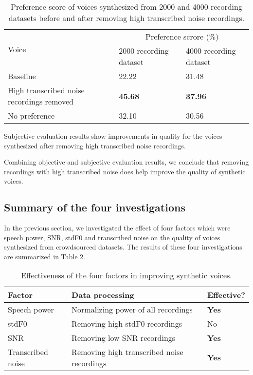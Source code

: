\documentclass[12pt]{article}
\begin{document}
\begin{table}[]
\begin{center}
\caption{Preference score of voices synthesized from 2000 and 4000-recording datasets before and after removing high transcribed noise recordings.}
\label{tab_subEvaTranscribedNoise}
\vspace{3mm}
\begin{tabular}{|l|m{2.8cm}|m{2.8cm}|}
\hline
\multirow{2}{4cm}{Voice} &
\multicolumn{2}{c|}{Preference scrore (\%)} \\ \cline{2-3}
& 2000-recording dataset & 4000-recording dataset \\
\hline
Baseline & 22.22 & 31.48 \\
High transcribed noise recordings removed & \textbf{45.68} & \textbf{37.96} \\
No preference & 32.10 & 30.56 \\
\hline
\end{tabular}
\end{center}
\end{table}

Subjective evaluation results show improvements in quality for the voices synthesized after removing high transcribed noise recordings.

Combining objective and subjective evaluation results, we conclude that removing recordings with high transcribed noise does help improve the quality of synthetic voices.

\subsection{Summary of the four investigations}
In the previous section, we investigated the effect of four factors which were speech power, SNR, stdF0 and transcribed noise on the quality of voices synthesized from crowdsourced datasets. The results of these four investigations are summarized in Table \ref{tab_investigationsSummary}.

\begin{table}[]
\begin{center}
\caption{Effectiveness of the four factors in improving synthetic voices.}
\label{tab_investigationsSummary}
\vspace{3mm}
\begin{tabular}{|m{3.2cm}|m{8cm}|m{1.8cm}|}
\hline
Factor & Data processing & Effective? \\
\hline
Speech power & Normalizing power of all recordings & \textbf{Yes} \\
stdF0 & Removing high stdF0 recordings & No \\
SNR & Removing low SNR recordings & \textbf{Yes} \\
Transcribed noise & Removing high transcribed noise recordings & \textbf{Yes} \\
\hline
\end{tabular}
\end{center}
\end{table}
\end{document}

